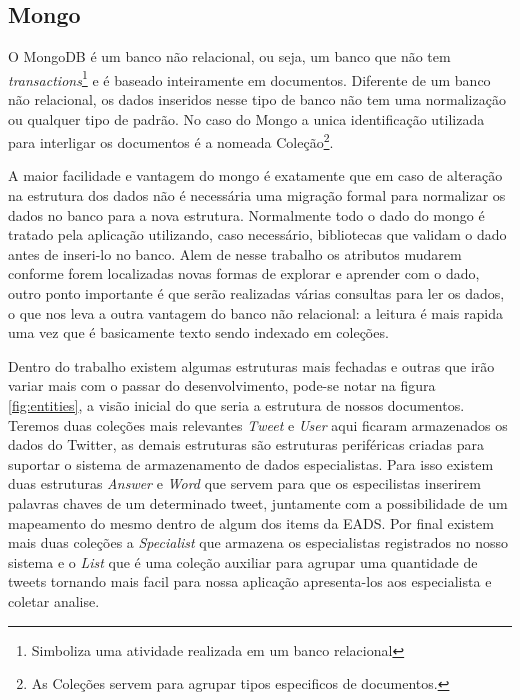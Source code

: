 \subsection{Mongo}
O MongoDB é um banco não relacional, ou seja, um banco que não tem \textit{transactions}\footnote{Simboliza uma atividade realizada em um banco relacional} e é baseado inteiramente em documentos. Diferente de um banco não relacional, os dados inseridos nesse tipo de banco não tem uma normalização ou qualquer tipo de padrão. No caso do Mongo a unica identificação utilizada para interligar os documentos é a nomeada Coleção\footnote{As Coleções servem para agrupar tipos especificos de documentos.}.

A maior facilidade e vantagem do mongo é exatamente que em caso de alteração na estrutura dos dados não é necessária uma migração formal para normalizar os dados no banco para a nova estrutura. Normalmente todo o dado do mongo é tratado pela aplicação utilizando, caso necessário, bibliotecas que validam o dado antes de inseri-lo no banco. Alem de nesse trabalho os atributos mudarem conforme forem localizadas novas formas de explorar e aprender com o dado, outro ponto importante é que serão realizadas várias consultas para ler os dados, o que nos leva a outra vantagem do banco não relacional: a leitura é mais rapida uma vez que é basicamente texto sendo indexado em coleções.

Dentro do trabalho existem algumas estruturas mais fechadas e outras que irão variar mais com o passar do desenvolvimento, pode-se notar na figura \ref{fig:entities}, a visão inicial do que seria a estrutura de nossos documentos. Teremos duas coleções mais relevantes \textit{Tweet} e \textit{User} aqui ficaram armazenados os dados do Twitter, as demais estruturas são estruturas periféricas criadas para suportar o sistema de armazenamento de dados especialistas. Para isso existem duas estruturas \textit{Answer} e \textit{Word} que servem para que os especilistas inserirem palavras chaves de um determinado tweet, juntamente com a possibilidade de um mapeamento do mesmo dentro de algum dos items da EADS. Por final existem mais duas coleções a \textit{Specialist} que armazena os especialistas registrados no nosso sistema e o \textit{List} que é uma coleção auxiliar para agrupar uma quantidade de tweets tornando mais facil para nossa aplicação apresenta-los aos especialista e coletar analise.


